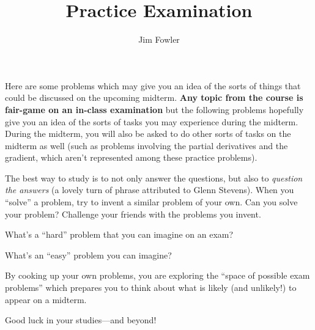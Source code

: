 \documentclass{ximera}
\author{Jim Fowler}
\title{Practice Examination}
\begin{document}
\maketitle

Here are some problems which may give you an idea of the sorts of
things that could be discussed on the upcoming midterm.  \textbf{Any
  topic from the course is fair-game on an in-class examination} but
the following problems hopefully give you an idea of the sorts of
tasks you may experience during the midterm.  During the midterm, you
will also be asked to do other sorts of tasks on the midterm as well
(such as problems involving the partial derivatives and the gradient,
which aren't represented among these practice problems).

The best way to study is to not only answer the questions, but also to
\textit{question the answers} (a lovely turn of phrase attributed to
Glenn Stevens).  When you ``solve'' a problem, try to invent a similar
problem of your own.  Can you solve your problem?  Challenge your
friends with the problems you invent.

What's a ``hard'' problem that you can imagine on an exam?
\begin{freeResponse}
\end{freeResponse}

What's an ``easy'' problem you can imagine?
\begin{freeResponse}
\end{freeResponse}

By cooking up your own problems, you are exploring the ``space of
possible exam problems'' which prepares you to think about what is
likely (and unlikely!) to appear on a midterm.

Good luck in your studies---and beyond!
\end{document}
